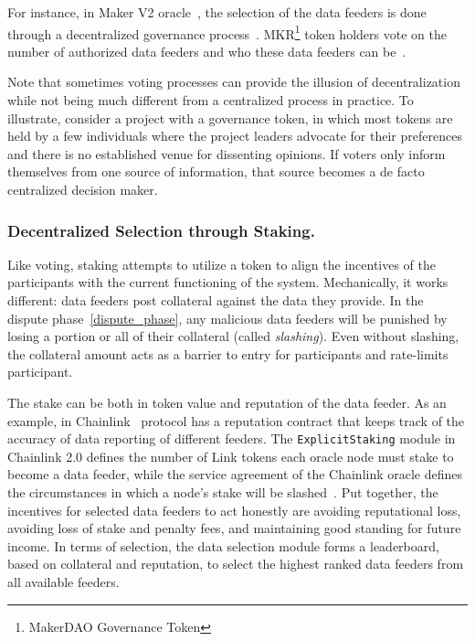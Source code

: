 For instance, in Maker V2 oracle~\cite{MAKERDAOOracle}, the selection of the data feeders is done through a decentralized governance process~\cite{gu2020empirical}. MKR\footnote{MakerDAO Governance Token} token holders vote on the number of authorized data feeders and who these data feeders can be~\cite{coinmonkMKRgovernance}. 


Note that sometimes voting processes can provide the illusion of decentralization while not being much different from a centralized process in practice. To illustrate, consider a project with a governance token, in which most tokens are held by a few individuals where the project leaders advocate for their preferences and there is no established venue for dissenting opinions. If voters only inform themselves from one source of information, that source becomes a de facto centralized decision maker. 

\subsubsection{Decentralized Selection through Staking.} Like voting, staking attempts to utilize a token to align the incentives of the participants with the current functioning of the system. Mechanically, it works different: data feeders post collateral against the data they provide. In the dispute phase~\ref{dispute_phase}, any malicious data feeders will be punished by losing a portion or all of their collateral (called \textit{slashing}). Even without slashing, the collateral amount acts as a barrier to entry for participants and rate-limits participant.  

The stake can be both in token value and reputation of the data feeder. As an example, in Chainlink~\cite{ellis2017chainlink} protocol has a reputation contract that keeps track of the accuracy of data reporting of different feeders. The \texttt{ExplicitStaking} module in Chainlink 2.0 defines the number of Link tokens each oracle node must stake to become a data feeder, while the service agreement of the Chainlink oracle defines the circumstances in which a node's stake will be slashed~\cite{chainlinkExplicitStaking}. Put together, the incentives for selected data feeders to act honestly are avoiding reputational loss, avoiding loss of stake and penalty fees, and maintaining good standing for future income. In terms of selection, the data selection module forms a leaderboard, based on collateral and reputation, to select the highest ranked data feeders from all available feeders.

